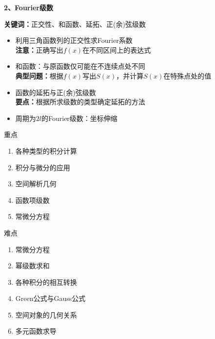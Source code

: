 \begin{frame}
	\linespread{1.2}
	{\bf 2、Fourier级数}\pause 
	
	{\b{\bf 关键词：}\pause 正交性、\pause 和函数、\pause 延拓、\pause 正(余)弦级数}\pause 
	\begin{itemize}
	  \item 利用三角函数列的正交性求Fourier系数\pause \\
	  {\bf 注意：}正确写出$f(x)$在不同区间上的表达式\pause 
	  \item 和函数：\pause 与原函数仅可能在不连续点处不同\pause \\
	  {\bf 典型问题：}根据$f(x)$写出$S(x)$，并计算$S(x)$在特殊点处的值\pause 
	  \item 函数的延拓与正(余)弦级数\pause \\
	  {\bf 要点：}根据所求级数的类型确定延拓的方法\pause 
	  \item 周期为$2l$的Fourier级数：坐标伸缩
	\end{itemize}
\end{frame}

\begin{frame}{重点}
	\linespread{1.5}\pause 
	{\bf 
	\begin{enumerate}
	  \item 各种类型的积分计算\pause 
	  \item 积分与微分的应用\pause 
	  \item 空间解析几何\pause 
	  \item 函数项级数\pause 
	  \item 常微分方程
	\end{enumerate}
	}
\end{frame}

\begin{frame}{难点}
	\linespread{1.2}\pause 
	\begin{enumerate}
	  \item 常微分方程\pause 
	  \item 幂级数求和\pause 
	  \item 各种积分的相互转换\pause 
	  \item Green公式与Gauss公式\pause 
	  \item 空间对象的几何关系\pause 
	  \item 多元函数求导
	\end{enumerate}
\end{frame}


% 
